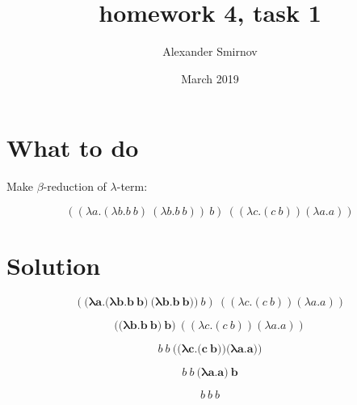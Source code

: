 \documentclass{article}
\title{homework 4, task 1}
\author{Alexander Smirnov}
\date{March 2019}
\begin{document}
\maketitle

\section{What to do}
Make $\beta$-reduction of $\lambda$-term:

$$((\lambda a.(\lambda b.b\:b)\:(\lambda b.b\:b))\:b)\:((\lambda c.(c\:b)) (\lambda a.a))$$

\section{Solution}

$$(\mathbf{\textbf{(} \lambda a.\textbf{(}\lambda b.b\:b\textbf{)}\:\textbf{(}\lambda b.b\:b\textbf{)}\textbf{)}}\:b)\:((\lambda c.(c\:b)) (\lambda a.a))$$

$$\mathbf{\textbf{(}\textbf{(}\lambda b.b\:b\textbf{)}\:b\textbf{)}}\:((\lambda c.(c\:b)) (\lambda a.a))$$

$$b\:b\:\mathbf{\textbf{(}\textbf{(}\lambda c.\textbf{(}c\:b\textbf{)}\textbf{)} \textbf{(}\lambda a.a\textbf{)}\textbf{)}}$$

$$b\:b\:\mathbf{\textbf{(}\lambda a.a\textbf{)}\:b}$$

$$b\:b\:b$$
\end{document}

